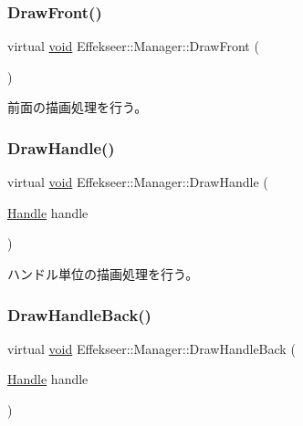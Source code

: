 \subsubsection{\texorpdfstring{Draw\+Front()}{DrawFront()}}
{\footnotesize\ttfamily virtual \mbox{\hyperlink{namespace_effekseer_ab34c4088e512200cf4c2716f168deb56}{void}} Effekseer\+::\+Manager\+::\+Draw\+Front (\begin{DoxyParamCaption}{ }\end{DoxyParamCaption})\hspace{0.3cm}{\ttfamily [pure virtual]}}



前面の描画処理を行う。 

\mbox{\label{class_effekseer_1_1_manager_a9eaa0c0f968351b53c46f9735cc40a79}} 
\subsubsection{\texorpdfstring{Draw\+Handle()}{DrawHandle()}}
{\footnotesize\ttfamily virtual \mbox{\hyperlink{namespace_effekseer_ab34c4088e512200cf4c2716f168deb56}{void}} Effekseer\+::\+Manager\+::\+Draw\+Handle (\begin{DoxyParamCaption}\item[{\mbox{\hyperlink{namespace_effekseer_afba58b8d812da862190e9bbfc040824a}{Handle}}}]{handle }\end{DoxyParamCaption})\hspace{0.3cm}{\ttfamily [pure virtual]}}



ハンドル単位の描画処理を行う。 

\mbox{\label{class_effekseer_1_1_manager_ab1c00890b1e6f88f0fcd159f32ff0f84}} 
\subsubsection{\texorpdfstring{Draw\+Handle\+Back()}{DrawHandleBack()}}
{\footnotesize\ttfamily virtual \mbox{\hyperlink{namespace_effekseer_ab34c4088e512200cf4c2716f168deb56}{void}} Effekseer\+::\+Manager\+::\+Draw\+Handle\+Back (\begin{DoxyParamCaption}\item[{\mbox{\hyperlink{namespace_effekseer_afba58b8d812da862190e9bbfc040824a}{Handle}}}]{handle }\end{DoxyParamCaption})\hspace{0.3cm}{\ttfamily [pure virtual]}}



